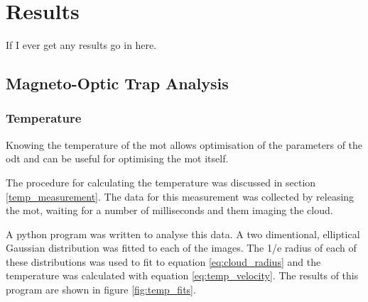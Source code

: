 \chapter{Results}

{\color{red}If I ever get any results go in here.}

\section{Magneto-Optic Trap Analysis}

\subsection{Temperature}
Knowing the temperature of the \gls{mot} allows optimisation of the parameters of the \gls{odt} and can be useful for optimising the \gls{mot} itself.

The procedure for calculating the temperature was discussed in section \ref{temp_measurement}. The data for this measurement was collected by releasing the \gls{mot}, waiting for a number of milliseconds and them imaging the cloud.

A python program was written to analyse this data. A two dimentional, elliptical Gaussian distribution was fitted to each of the images. The 1/e radius of each of these distributions was used to fit to equation \ref{eq:cloud_radius} and the temperature was calculated with equation \ref{eq:temp_velocity}. The results of this program are shown in figure \ref{fig:temp_fits}.

